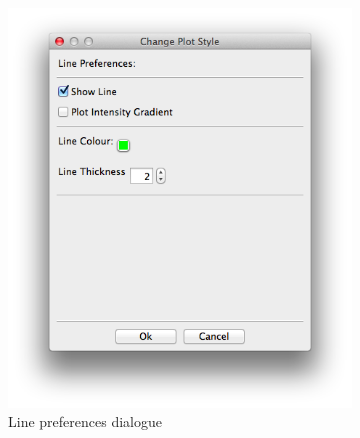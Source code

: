 \begin{figure}[h!]
    \centering
    \begin{subfigure}[b]{0.6\textwidth}
        \centering
        \includegraphics[width=\textwidth]{images/plot_preferences_dialogue.png}
        \caption{Line preferences dialogue}
        \label{fig:plot_prefs_dialogue}
    \end{subfigure}
    \begin{subfigure}[b]{0.3\textwidth}
        \centering

\end{subfigure}
\end{figure}
